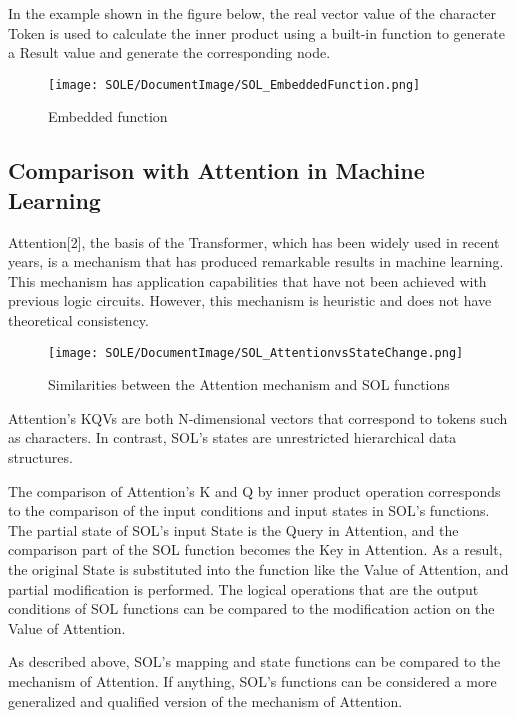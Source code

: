 \documentclass[12pt]{article}
\begin{document}
In the example shown in the figure below, the real vector value of the
character Token is used to calculate the inner product using a built-in
function to generate a Result value and generate the corresponding node.

\begin{figure}[ht]
  \centering
  \texttt{[image: SOLE/DocumentImage/SOL\_EmbeddedFunction.png]}
  \caption{Embedded function}
  \label{fig:embedded_function}
\end{figure}

\subsection{Comparison with Attention in Machine
Learning}\label{comparison-with-attention-in-machine-learning}

Attention{[}2{]}, the basis of the Transformer, which has been widely
used in recent years, is a mechanism that has produced remarkable
results in machine learning. This mechanism has application capabilities
that have not been achieved with previous logic circuits. However, this
mechanism is heuristic and does not have theoretical consistency.

\begin{figure}[ht]
  \centering
  \texttt{[image: SOLE/DocumentImage/SOL\_AttentionvsStateChange.png]}
  \caption{Similarities between the Attention mechanism and SOL functions}
  \label{fig:similarities_between_the_attention_mechanism_and_sol_functions}
\end{figure}

Attention's KQVs are both N-dimensional vectors that correspond to
tokens such as characters. In contrast, SOL's states are unrestricted
hierarchical data structures.

The comparison of Attention's K and Q by inner product operation
corresponds to the comparison of the input conditions and input states
in SOL's functions. The partial state of SOL's input State is the Query
in Attention, and the comparison part of the SOL function becomes the
Key in Attention. As a result, the original State is substituted into
the function like the Value of Attention, and partial modification is
performed. The logical operations that are the output conditions of SOL
functions can be compared to the modification action on the Value of
Attention.

As described above, SOL's mapping and state functions can be compared to
the mechanism of Attention. If anything, SOL's functions can be
considered a more generalized and qualified version of the mechanism of
Attention.
\end{document}
